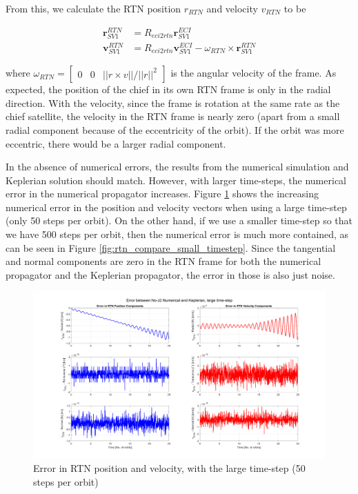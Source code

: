 From this, we calculate the RTN position $r_{RTN}$ and velocity $v_{RTN}$ to be

\begin{align}
    \boldsymbol{r}^{RTN}_{SV1} &= R_{eci2rtn} \boldsymbol{r}^{ECI}_{SV1} \\
    \boldsymbol{v}^{RTN}_{SV1} &= R_{eci2rtn} \boldsymbol{v}^{ECI}_{SV1} - \omega_{RTN} \times \boldsymbol{r}^{RTN}_{SV1} \label{eq:v_rtn}
\end{align}

where $\omega_{RTN} = \begin{bmatrix}
    0 & 0 & ||r\times v ||/||r||^2
\end{bmatrix}$ is the angular velocity of the frame. As expected, the position of the chief in its own RTN frame is only in the radial direction. With the velocity, since the frame is rotation at the same rate as the chief satellite, the velocity in the RTN frame is nearly zero (apart from a small radial component because of the eccentricity of the orbit). If the orbit was more eccentric, there would be a larger radial component.

In the absence of numerical errors, the results from the numerical simulation and Keplerian solution should match. However, with larger time-steps, the numerical error in the numerical propagator increases. Figure \ref{fig:rtn_compare_large_timestep} shows the increasing numerical error in the position and velocity vectors when using a large time-step (only 50 steps per orbit). On the other hand, if we use a smaller time-step so that we have 500 steps per orbit, then the numerical error is much more contained, as can be seen in Figure \ref{fig:rtn_compare_small_timestep}. Since the tangential and normal components are zero in the RTN frame for both the numerical propagator and the Keplerian propagator, the error in those is also just noise.

\begin{figure}[H]
    \centering
    \includegraphics[width=0.75\linewidth]{sim/figures/comparing_rtn_large_timestep.png}
    \caption{Error in RTN position and velocity, with the large time-step (50 steps per orbit)}
    \label{fig:rtn_compare_large_timestep}
\end{figure}

